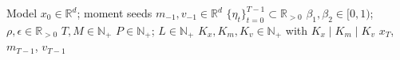 \documentclass{article}
\begin{document}
\begin{algorithm}[ht]
\caption{FAUST-ADOPT with Explicit SP--DP Collective Orchestration}
\label{alg:desloc_adopt}
\begin{algorithmic}[1]
\REQUIRE Model $x_0 \in \mathbb{R}^d$; moment seeds $m_{-1}, v_{-1} \in \mathbb{R}^d$
\REQUIRE $\{\eta_t\}_{t=0}^{T-1} \subset \mathbb{R}_{>0}$ 
\REQUIRE $\beta_1, \beta_2 \in [0,1)$; $\rho, \epsilon \in \mathbb{R}_{>0}$ 
\REQUIRE $T, M \in \mathbb{N}_+$ 
\REQUIRE $P \in \mathbb{N}_+$; $L \in \mathbb{N}_+$ 
\REQUIRE $K_x, K_m, K_v \in \mathbb{N}_+$ with $K_x \mid K_m \mid K_v$ 
\ENSURE $x_T$, $m_{T-1}$, $v_{T-1}$


\end{algorithmic}
\end{algorithm}
\end{document}
